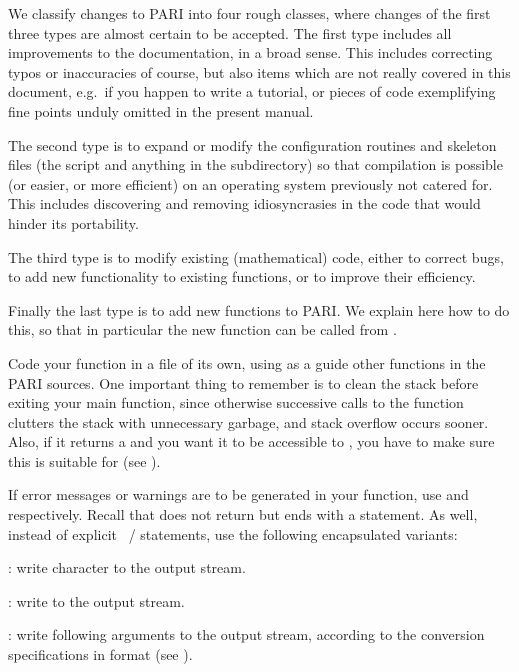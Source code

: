 We classify changes to PARI into four rough classes, where changes of the
first three types are almost certain to be accepted. The first type includes
all improvements to the documentation, in a broad sense. This includes
correcting typos or inaccuracies of course, but also items which are not
really covered in this document, e.g.~if you happen to write a tutorial,
or pieces of code exemplifying fine points unduly omitted in the present
manual.

The second type is to expand or modify the configuration routines and skeleton
files (the  script and anything in the 
subdirectory) so that compilation is possible (or easier, or more efficient)
on an operating system previously not catered for. This includes discovering
and removing idiosyncrasies in the code that would hinder its portability.

The third type is to modify existing (mathematical) code, either to correct
bugs, to add new functionality to existing functions, or to improve their
efficiency.

Finally the last type is to add new functions to PARI. We explain here how
to do this, so that in particular the new function can be called from .

\label{se:coding_guidelines}
\noindent
Code your function in a file of its own, using as a guide other functions
in the PARI sources. One important thing to remember is to clean the stack
before exiting your main function, since otherwise successive calls to
the function clutters the stack with unnecessary garbage, and stack
overflow occurs sooner. Also, if it returns a  and you want it
to be accessible to , you have to make sure this  is
suitable for  (see ).

If error messages or warnings are to be generated in your function, use
 and  respectively.
Recall that  does not return but ends with a 
statement. As well, instead of explicit ~/ 
statements, use the following encapsulated variants:

: write character  to the output stream.

: write  to the output stream.

: write following arguments to the
output stream, according to the conversion specifications in format 
(see ).

